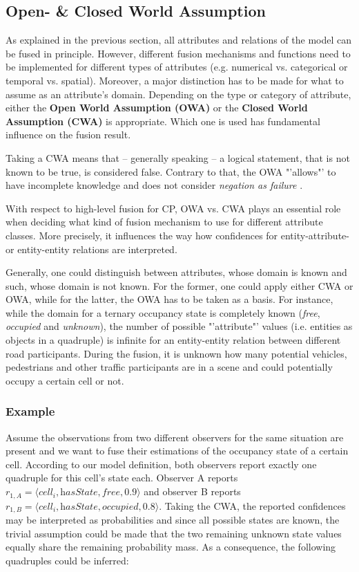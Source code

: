 \subsection{Open- \& Closed World Assumption}
\label{subsec:concept_design:fusion_open_closed_world_assumption}
As explained in the previous section, all attributes and relations of the model can be fused in principle. However, different fusion mechanisms and functions need to be implemented for different types of attributes (e.g. numerical vs. categorical or temporal vs. spatial). Moreover, a major distinction has to be made for what to assume as an attribute's domain. Depending on the type or category of attribute, either the  \textbf{Open World Assumption (OWA)} or the \textbf{Closed World Assumption (CWA)} is appropriate. Which one is used has fundamental influence on the fusion result.

Taking a CWA means that – generally speaking – a logical statement, that is not known to be true, is considered false. Contrary to that, the OWA "'allows"' to have incomplete knowledge and does not consider \textit{negation as failure} \cite{wiki:neaf}. 

With respect to high-level fusion for CP, OWA vs. CWA plays an essential role when deciding what kind of fusion mechanism to use for different attribute classes. More precisely, it influences the way how confidences for entity-attribute- or entity-entity relations are interpreted. 

Generally, one could distinguish between attributes, whose domain is known and such, whose domain is not known. For the former, one could apply either CWA or OWA, while for the latter, the OWA has to be taken as a basis. For instance, while the domain for a ternary occupancy state is completely known (\textit{free}, \textit{occupied} and \textit{unknown}), the number of possible "'attribute"' values (i.e. entities as objects in a quadruple) is infinite for an entity-entity relation between different road participants. During the fusion, it is unknown how many potential vehicles, pedestrians and other traffic participants are in a scene and could potentially occupy a certain cell or not.

\subsubsection{Example}
Assume the observations from two different observers for the same situation are present and we want to fuse their estimations of the occupancy state of a certain cell. According to our model definition, both observers report exactly one quadruple for this cell's state each. Observer A reports $r_{1,A} = \langle \textit{cell}_i, \textit{hasState}, \textit{free}, 0.9 \rangle$ and observer B reports $r_{1,B} = \langle \textit{cell}_i, \textit{hasState}, \textit{occupied}, 0.8 \rangle$. Taking the CWA, the reported confidences may be interpreted as probabilities and since all possible states are known, the trivial assumption could be made that the two remaining unknown state values equally share the remaining probability mass. As a consequence, the following quadruples could be inferred:

